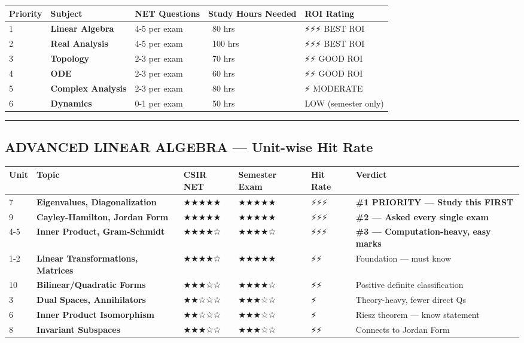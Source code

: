 \documentclass[12pt,a4paper,openany]{book}
\begin{document}
{\begin{center}
\begin{tabular}{|l|l|l|l|l|}
\hline
\textbf{Priority} & \textbf{Subject} & \textbf{NET Questions} & \textbf{Study Hours Needed} & \textbf{ROI Rating} \\
\hline
1 & \textbf{Linear Algebra} & 4-5 per exam & ~80 hrs & ⚡⚡⚡ BEST ROI \\
\hline
2 & \textbf{Real Analysis} & 4-5 per exam & ~100 hrs & ⚡⚡⚡ BEST ROI \\
\hline
3 & \textbf{Topology} & 2-3 per exam & ~70 hrs & ⚡⚡ GOOD ROI \\
\hline
4 & \textbf{ODE} & 2-3 per exam & ~60 hrs & ⚡⚡ GOOD ROI \\
\hline
5 & \textbf{Complex Analysis} & 2-3 per exam & ~80 hrs & ⚡ MODERATE \\
\hline
6 & \textbf{Dynamics} & 0-1 per exam & ~50 hrs &  LOW (semester only) \\
\hline
\end{tabular}
\end{center}

\bigskip\noindent\rule{\textwidth}{0.4pt}\bigskip

\subsection{ ADVANCED LINEAR ALGEBRA — Unit-wise Hit Rate}

\begin{center}
\begin{tabular}{|l|l|l|l|l|l|}
\hline
\textbf{Unit} & \textbf{Topic} & \textbf{CSIR NET} & \textbf{Semester Exam} & \textbf{Hit Rate} & \textbf{Verdict} \\
\hline
7 & \textbf{Eigenvalues, Diagonalization} & ★★★★★ & ★★★★★ & ⚡⚡⚡ & \textbf{\#1 PRIORITY — Study this FIRST} \\
\hline
9 & \textbf{Cayley-Hamilton, Jordan Form} & ★★★★★ & ★★★★★ & ⚡⚡⚡ & \textbf{\#2 — Asked every single exam} \\
\hline
4-5 & \textbf{Inner Product, Gram-Schmidt} & ★★★★☆ & ★★★★☆ & ⚡⚡⚡ & \textbf{\#3 — Computation-heavy, easy marks} \\
\hline
1-2 & \textbf{Linear Transformations, Matrices} & ★★★★☆ & ★★★★★ & ⚡⚡ & Foundation — must know \\
\hline
10 & \textbf{Bilinear/Quadratic Forms} & ★★★☆☆ & ★★★★☆ & ⚡⚡ & Positive definite classification \\
\hline
3 & \textbf{Dual Spaces, Annihilators} & ★★☆☆☆ & ★★★☆☆ & ⚡ & Theory-heavy, fewer direct Qs \\
\hline
6 & \textbf{Inner Product Isomorphism} & ★★☆☆☆ & ★★★☆☆ & ⚡ & Riesz theorem — know statement \\
\hline
8 & \textbf{Invariant Subspaces} & ★★★☆☆ & ★★★☆☆ & ⚡⚡ & Connects to Jordan Form \\
\hline
\end{tabular}
\end{center}

}
\end{document}
